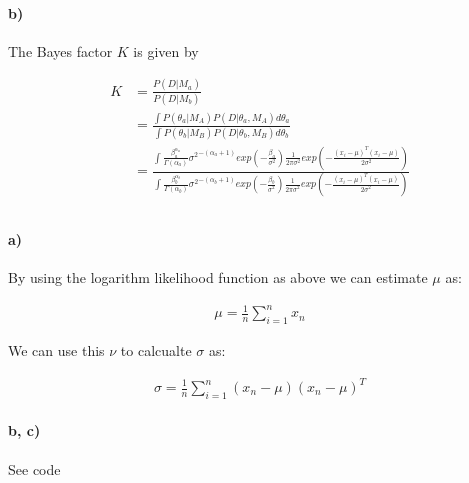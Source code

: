 \documentclass{article}
\begin{document}
\paragraph{b)}

The Bayes factor $K$ is given by

\begin{align*}
  K &= \frac{P \left( D \vert M_a \right)}{P \left( D \vert M_b \right)} \\
  &= \frac{ \int P \left( \theta_a \vert M_A \right) P \left( D \vert \theta_a , M_A \right) d \theta_a}
  { \int P \left( \theta_b \vert M_B \right) P \left( D \vert \theta_b , M_B \right) d \theta_b} \\
  &= \frac{ \int \frac{\beta_{a}^{\alpha_a}}{\Gamma (\alpha_a)}
    {\sigma^2}^{-(\alpha_a + 1)} exp \left( - \frac{\beta_a}{\sigma^2} \right)
    \frac{1}{2\pi\sigma^2}
    exp{\left( - \frac{(x_i - \mu)^T(x_i - \mu)}{2\sigma^2} \right)}}
    { \int \frac{\beta_{b}^{\alpha_b}}{\Gamma (\alpha_b)}
    {\sigma^2}^{-(\alpha_b + 1)} exp \left( - \frac{\beta_b}{\sigma^2} \right)
    \frac{1}{2\pi\sigma^2}
    exp{\left( - \frac{(x_i - \mu)^T(x_i - \mu)}{2\sigma^2} \right)}}
\end{align*}

\setcounter{section}{2}
\setcounter{subsection}{0}
\subsection{}
\paragraph{a)}

By using the logarithm likelihood function as above we can estimate $\mu$ as:

\begin{align}
  \mu = \frac{1}{n} \sum_{i = 1}^{n} x_n
\end{align}

We can use this $\nu$ to calcualte $\sigma$ as:

\begin{align}
  \sigma = \frac{1}{n} \sum_{i = 1}^{n} (x_n - \mu)(x_n - \mu)^T
\end{align}

\paragraph{b, c)}
See code
\end{document}
